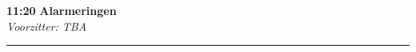 \documentclass[a4paper,10pt]{report}
\begin{document}
\begin{multicols*}{3}
\begin{packed_enum}
\item[\textbf{11:20}] \textbf{Alarmeringen}\\\textit{Voorzitter: TBA}
\end{packed_enum}


\hrule\strut


\end{multicols*}
\end{document}

